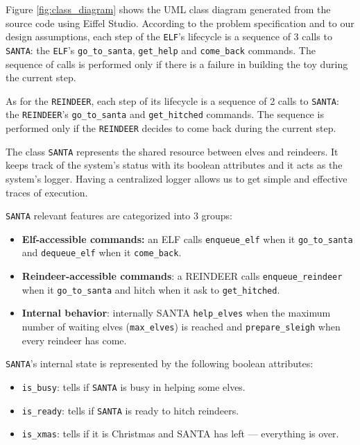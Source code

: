 
Figure \ref{fig:class_diagram} shows the UML class diagram generated from the
source code using Eiffel Studio.
According to the problem specification and to our design assumptions, each step
of the \texttt{ELF}'s lifecycle is a sequence of 3 calls to \texttt{SANTA}: the
\texttt{ELF}'s \texttt{go\_to\_santa}, \texttt{get\_help} and
\texttt{come\_back} commands. The sequence of calls is performed only if there is a failure in
building the toy during the current step.

As for the \texttt{REINDEER}, each step of its lifecycle is a sequence of 2
calls to \texttt{SANTA}: the \texttt{REINDEER}'s \texttt{go\_to\_santa} and
\texttt{get\_hitched} commands. The sequence is performed only if the \texttt{REINDEER}
decides to come back during the current step.

The class \texttt{SANTA} represents the shared resource between elves and reindeers.
It keeps track of the system's status with its boolean attributes and it acts
as the system's logger. Having a centralized logger allows us to get simple and effective traces of execution.

\texttt{SANTA} relevant features are categorized into 3 groups:

\begin{itemize}
    \item \textbf{Elf-accessible commands:} an ELF calls \texttt{enqueue\_elf}
when it \texttt{go\_to\_santa} and \texttt{dequeue\_elf} when it
\texttt{come\_back}. 
    \item \textbf{Reindeer-accessible commands}: a REINDEER calls
\texttt{enqueue\_reindeer} when it \texttt{go\_to\_santa} and hitch when it ask
to \texttt{get\_hitched}.
    \item \textbf{Internal behavior}: internally SANTA \texttt{help\_elves}
when the maximum number of waiting elves (\texttt{max\_elves}) is reached and
\texttt{prepare\_sleigh} when every reindeer has come.
\end{itemize}

\texttt{SANTA}'s internal state is represented by the following boolean attributes:

\begin{itemize}
    \item \texttt{is\_busy}: tells if \texttt{SANTA} is busy in helping some elves.
    \item \texttt{is\_ready}: tells if \texttt{SANTA} is ready to hitch reindeers.
    \item \texttt{is\_xmas}: tells if it is Christmas and SANTA has left --- everything is over.
\end{itemize}

